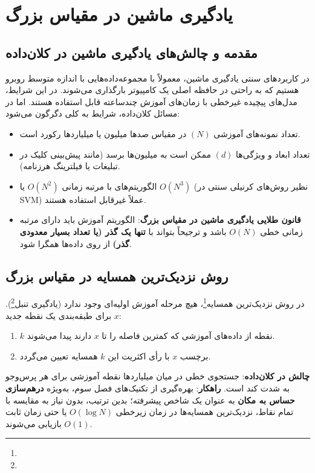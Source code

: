 \chapter{یادگیری ماشین در مقیاس بزرگ \texorpdfstring{}{(Large-Scale Machine Learning)}}
\label{ch:large-scale-ml}

\section{مقدمه و چالش‌های یادگیری ماشین در کلان‌داده}
در کاربردهای سنتی یادگیری ماشین، معمولاً با مجموعه‌داده‌هایی با اندازه متوسط روبرو هستیم که به راحتی در حافظه اصلی یک کامپیوتر بارگذاری می‌شوند. در این شرایط، مدل‌های پیچیده غیرخطی با زمان‌های آموزش چندساعته قابل استفاده هستند. اما در مسائل کلان‌داده، شرایط به کلی دگرگون می‌شود:
\begin{itemize}
    \item تعداد نمونه‌های آموزشی $(N)$ در مقیاس صدها میلیون یا میلیاردها رکورد است.
    \item تعداد ابعاد و ویژگی‌ها $(d)$ ممکن است به میلیون‌ها برسد (مانند پیش‌بینی کلیک در تبلیغات یا فیلترینگ هرزنامه).
    \item الگوریتم‌های با مرتبه زمانی $O(N^2)$ یا $O(N^3)$ (نظیر روش‌های کرنیلی سنتی در SVM) عملاً غیرقابل استفاده هستند.
    \item \textbf{قانون طلایی یادگیری ماشین در مقیاس بزرگ}: الگوریتم آموزش باید دارای مرتبه زمانی خطی $O(N)$ باشد و ترجیحاً بتواند با \textbf{تنها یک گذر (یا تعداد بسیار معدودی گذر)} از روی داده‌ها همگرا شود.
\end{itemize}

\section{روش نزدیک‌ترین همسایه در مقیاس بزرگ \texorpdfstring{}{(k-NN)}}
در روش نزدیک‌ترین همسایه\footnote{}، هیچ مرحله آموزش اولیه‌ای وجود ندارد (یادگیری تنبل\footnote{}). برای طبقه‌بندی یک نقطه جدید $x$:
\begin{enumerate}
    \item $k$ نقطه از داده‌های آموزشی که کمترین فاصله را تا $x$ دارند پیدا می‌شوند.
    \item برچسب $x$ با رأی اکثریت این $k$ همسایه تعیین می‌گردد.
\end{enumerate}

\textbf{چالش در کلان‌داده}: جستجوی خطی در میان میلیاردها نقطه آموزشی برای هر پرس‌وجو به شدت کند است.
\textbf{راهکار}: بهره‌گیری از تکنیک‌های فصل سوم، به‌ویژه \textbf{درهم‌سازی حساس به مکان } به عنوان یک شاخص پیشرفته؛ بدین ترتیب، بدون نیاز به مقایسه با تمام نقاط، نزدیک‌ترین همسایه‌ها در زمان زیرخطی $O(\log N)$ یا حتی زمان ثابت $O(1)$ بازیابی می‌شوند.


